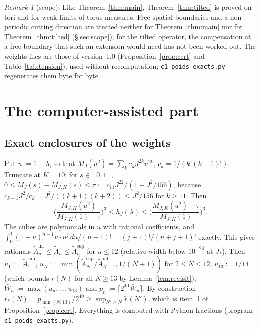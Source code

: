 \documentclass[11pt,a4paper]{article}
\theoremstyle{plain}
\theoremstyle{remark}
\newtheorem{remark}[theorem]{Remark}
\numberwithin{equation}{section}
\newcommand{\At}{\widetilde A}
\newcommand{\rt}{\widetilde r}
\newcommand{\rb}{\bar r}
\begin{document}
\begin{remark}[scope]\label{rem:tiltscope}
Like Theorem~\ref{thm:main}, Theorem~\ref{thm:tilted} is proved on tori and for weak limits of torus measures. Free spatial boundaries and
a non-periodic cutting direction are treated neither for Theorem~\ref{thm:main} nor for Theorem~\ref{thm:tilted} (\S\ref{sec:scope}); for
the tilted operator, the compensation at a free boundary that such an extension would need has not been worked out. The weights files
are those of version~1.0 (Proposition~\ref{prop:cert} and Table~\ref{tab:tension}), used without recomputation;
\texttt{c1\_poids\_exacts.py} regenerates them byte for byte.
\end{remark}

\section{The computer-assisted part}\label{sec:cap}

\subsection{Exact enclosures of the weights}\label{sec:weights}
Put $u:=1-\lambda$, so that $M_J(u^2)=\sum_kc_kJ^{2k}u^{2k}$, $c_k=1/(k!(k+1)!)$. Truncate at $K=10$: for $s\in[0,1]$,
$0\le M_J(s)-M_{J,K}(s)\le\tau:=c_{11}J^{22}/(1-J^2/156)$, because $c_{k+1}J^2/c_k=J^2/((k+1)(k+2))\le J^2/156$ for $k\ge11$. Then
\[
\Big(\frac{M_{J,K}(u^2)}{M_{J,K}(1)+\tau}\Big)^3\le h_J(\lambda)\le\Big(\frac{M_{J,K}(u^2)+\tau}{M_{J,K}(1)}\Big)^3 .
\]
The cubes are polynomials in $u$ with rational coefficients, and $\int_0^1(1-u)^{n-1}u\cdot u^j\,du/(n-1)!=(j+1)!/(n+j+1)!$ exactly.
This gives rationals $\At_n^{\inf}\le\At_n\le\At_n^{\sup}$ for $n\le12$ (relative width below $10^{-24}$ at $J_*$). Then
$u_1:=\At_1^{\sup}$, $u_N:=\min(\At_N^{\sup}/\At_{N-1}^{\inf},1/(N+1))$ for $2\le N\le12$, $u_{13}:=1/14$ (which bounds $\rt(N)$ for all
$N\ge13$ by Lemma~\ref{lem:revisit}), $\bar W_n:=\max(u_n,\dots,u_{13})$ and $p_n:=\lceil2^{40}\bar W_n\rceil$. By construction
$\rb_*(N)=p_{\min(N,13)}/2^{40}\ge\sup_{N'\ge N}\rt(N')$, which is item~1 of Proposition~\ref{prop:cert}. Everything is computed with
Python fractions (program \texttt{c1\_poids\_exacts.py}).
\end{document}
